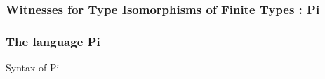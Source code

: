 \documentclass[svgnames,11pt]{beamer}
\begin{document}
\begin{frame}
\frametitle{Witnesses for Type Isomorphisms of Finite Types : {{Pi}} }


{\scriptsize





%
%
%

%
%
%
%

}


\end{frame}



\begin{frame}
\frametitle{ The language {{Pi}} }


\begin{block}{Syntax of {{Pi}} }
%

\end{block}



\end{frame}
\end{document}
